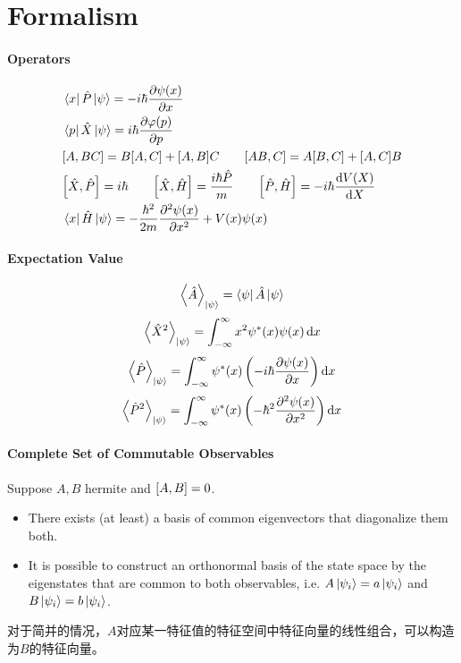 \documentclass[a4paper,10pt]{article}
\begin{document}
\section{Formalism}
\paragraph{Operators}
\begin{align*}
     & \bra{x}\hat{P}\ket{\psi}=-i\hbar\pdv{\psi(x)}{x}                                                                                   \\
     & \bra{p}\hat{X}\ket{\psi}=i\hbar\pdv{\varphi(p)}{p}                                                                                 \\
     & \comm{A}{BC}=B\comm{A}{C}+\comm{A}{B}C\qq{}\comm{AB}{C}=A\comm{B}{C}+\comm{A}{C}B                                                  \\
     & \comm{\hat{X}}{\hat{P}}=i\hbar\qq{}\comm{\hat{X}}{\hat{H}}=\frac{i\hbar\hat{P}}{m}\qq{}\comm{\hat{P}}{\hat{H}}=-i\hbar\dv{V(X)}{X} \\
     & \bra{x}\hat{H}\ket{\psi}=-\frac{\hbar^2}{2m}\pdv[2]{\psi(x)}{x}+V(x)\psi(x)
\end{align*}
\paragraph{Expectation Value}
$$\expval{\hat{A}}_{\ket{\psi}}=\bra{\psi}\hat{A}\ket{\psi}$$
$$\expval{\hat{X}^2}_{\ket{\psi}}=\int_{-\infty}^{\infty}x^2\psi^\ast(x)\psi(x)\dd{x}$$
$$\expval{\hat{P}}_{\ket{\psi}}=\int_{-\infty}^{\infty}\psi^\ast(x)\left(-i\hbar\pdv{\psi(x)}{x}\right)\dd{x}$$
$$\expval{\hat{P}^2}_{\ket{\psi}}=\int_{-\infty}^{\infty}\psi^\ast(x)\left(-\hbar^2\pdv[2]{\psi(x)}{x}\right)\dd{x}$$
\paragraph{Complete Set of Commutable Observables}
Suppose $A,B$ hermite and $\comm{A}{B}=0$.
\begin{itemize}
    \item There exists (at least) a basis of common eigenvectors that diagonalize them both.
    \item It is possible to construct an orthonormal basis of the state space by the eigenstates that are common to both observables, i.e. $A\ket{\psi_i}=a\ket{\psi_i}$ and $B\ket{\psi_i}=b\ket{\psi_i}$.
\end{itemize}
对于简并的情况，$A$对应某一特征值的特征空间中特征向量的线性组合，可以构造为$B$的特征向量。
\end{document}
